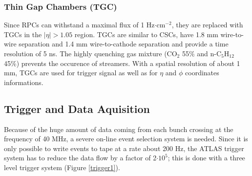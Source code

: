 \subsubsection{Thin Gap Chambers (TGC)}
Since RPCs can withstand a maximal flux of 1 Hz$\cdot$cm$^{-2}$, they are replaced with TGCs in the $|\eta|>1.05$ region. TGCs are similar to CSCs, have 1.8 mm wire-to-wire separation and 1.4 mm wire-to-cathode separation and provide a time resolution of 5 ns. The highly quenching gas mixture (CO$_{2}$ 55\% and n-C$_{5}$H$_{12}$ 45\%) prevents the occurence of streamers. With a spatial resolution of about 1 mm, TGCs are used for trigger signal as well as for $\eta$ and $\phi$ coordinates informations.


\subsection{Trigger and Data Aquisition}
Because of the huge amount of data coming from each bunch crossing at the frequency of 40 MHz, a severe on-line event selection system is needed. Since it is only possible to write events to tape at a rate about 200 Hz, the ATLAS trigger system has to reduce the data flow by a factor of 2$\cdot10^{5}$; this is done with a three level trigger system (Figure \ref{trigger1}).

